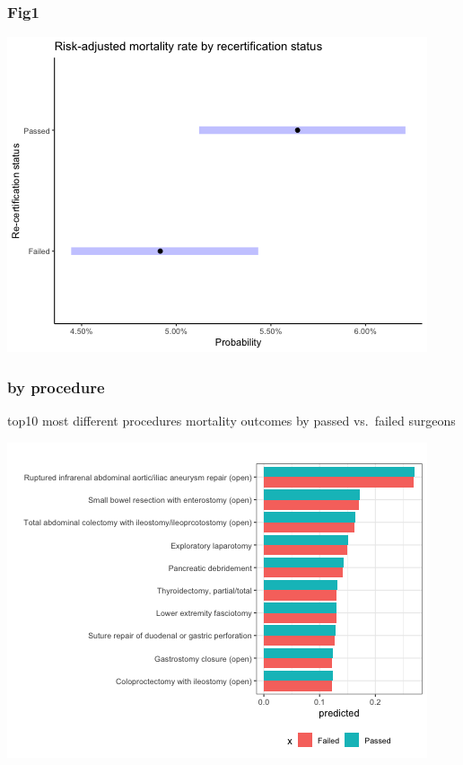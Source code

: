 \documentclass[
]{article}
\begin{document}
\hypertarget{fig1}{%
\subsubsection{Fig1}\label{fig1}}

\begin{center}\includegraphics[width=0.75\linewidth]{model_results_files/figure-latex/unnamed-chunk-3-1} \end{center}

\hypertarget{by-procedure}{%
\subsubsection{by procedure}\label{by-procedure}}

top10 most different procedures mortality outcomes by passed vs.~failed
surgeons

\begin{center}\includegraphics[width=0.75\linewidth]{model_results_files/figure-latex/unnamed-chunk-4-1} \end{center}
\end{document}
